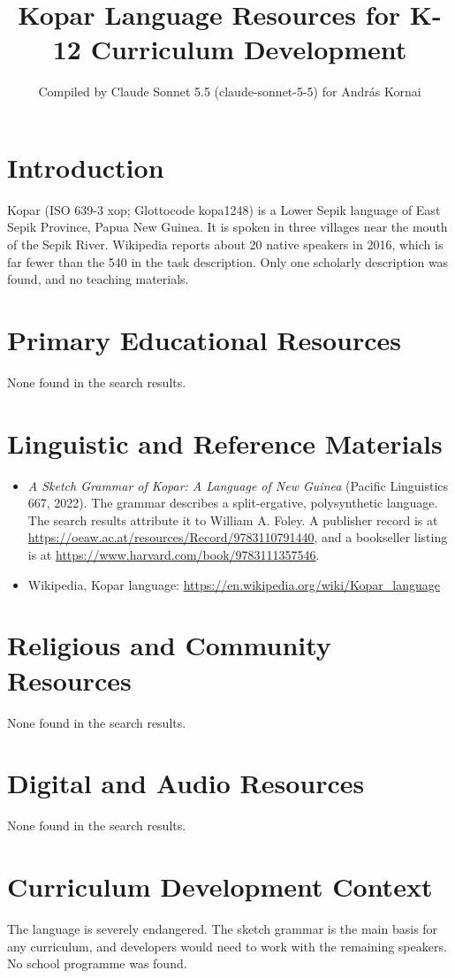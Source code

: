 \documentclass[12pt]{article}
\title{Kopar Language Resources for K-12 Curriculum Development}
\author{Compiled by Claude Sonnet 5.5 (claude-sonnet-5-5) for Andr\'as Kornai}
\date{}
\begin{document}
\maketitle
\section{Introduction}
Kopar (ISO 639-3 xop; Glottocode kopa1248) is a Lower Sepik language of East Sepik Province, Papua New Guinea. It is spoken in three villages near the mouth of the Sepik River. Wikipedia reports about 20 native speakers in 2016, which is far fewer than the 540 in the task description. Only one scholarly description was found, and no teaching materials.

\section{Primary Educational Resources}
None found in the search results.

\section{Linguistic and Reference Materials}
\begin{itemize}
\item \emph{A Sketch Grammar of Kopar: A Language of New Guinea} (Pacific Linguistics 667, 2022). The grammar describes a split-ergative, polysynthetic language. The search results attribute it to William A. Foley. A publisher record is at \url{https://oeaw.ac.at/resources/Record/9783110791440}, and a bookseller listing is at \url{https://www.harvard.com/book/9783111357546}.
\item Wikipedia, Kopar language: \url{https://en.wikipedia.org/wiki/Kopar_language}
\end{itemize}

\section{Religious and Community Resources}
None found in the search results.

\section{Digital and Audio Resources}
None found in the search results.

\section{Curriculum Development Context}
The language is severely endangered. The sketch grammar is the main basis for any curriculum, and developers would need to work with the remaining speakers. No school programme was found.
\end{document}
